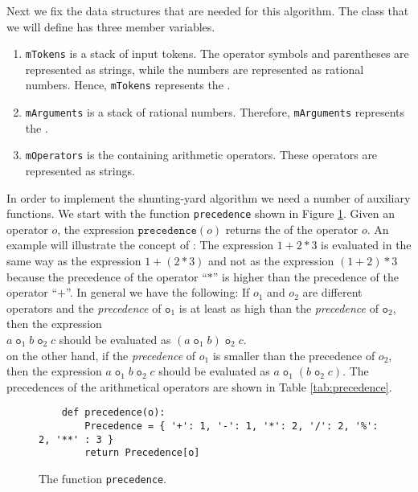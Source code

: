 Next we fix the data structures that are needed for this algorithm.  The class that we will define has three
member variables.
\begin{enumerate}
\item \texttt{mTokens} is a stack of input tokens.  The operator symbols and parentheses are
      represented as strings, while the numbers are represented as rational numbers.  Hence, \texttt{mTokens}
      represents the .
\item \texttt{mArguments} is a stack of rational numbers.  Therefore, \texttt{mArguments} represents the
      .
\item \texttt{mOperators} is the  containing arithmetic operators.  These operators
      are represented as strings.
\end{enumerate}
In order to implement the shunting-yard algorithm we need a number of auxiliary functions.
We start with the function \texttt{precedence} shown in Figure \ref{fig:precedence}.
Given an operator $o$, the expression $\texttt{precedence}(o)$ returns the  of the operator
$o$.  An example will illustrate the concept of :  The expression $1 + 2 * 3$
is evaluated in the same way as the expression $1 + (2*3)$ and not as the expression $(1+2)*3$ because the
precedence of the operator ``$*$'' is higher than the precedence of the operator ``$+$''.
In general we have the following:
If $o_1$ and $o_2$ are different operators and the \emph{precedence} of $\texttt{o}_1$ is at least as high than the 
\emph{precedence} of $\texttt{o}_2$, then the expression
\\[0.2cm]
\hspace*{1.3cm}
$a \;\texttt{o}_1\; b \;\texttt{o}_2\; c$ \quad should be evaluated as \quad
$(a \;\texttt{o}_1\; b) \;\texttt{o}_2\; c$.
\\[0.2cm]
on the other hand, if the \emph{precedence} of $o_1$ is smaller than the precedence of $o_2$, then the
expression $a \;\texttt{o}_1\; b \;\texttt{o}_2\; c$ should be evaluated as  $a \;\texttt{o}_1\; (b
\;\texttt{o}_2\; c)$.  
The precedences of the arithmetical operators are shown in Table \ref{tab:precedence}.

\begin{figure}[!ht]
\centering
\begin{verbatim}
    def precedence(o):
        Precedence = { '+': 1, '-': 1, '*': 2, '/': 2, '%': 2, '**' : 3 }
        return Precedence[o]
\end{verbatim}
\vspace*{-0.3cm}
\caption{The function \texttt{precedence}.}
\label{fig:precedence}
\end{figure}


